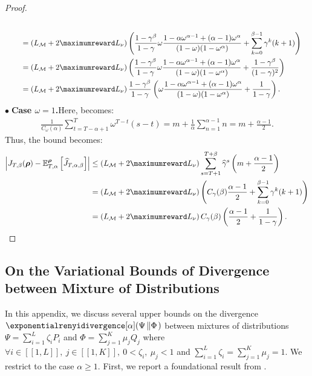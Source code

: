 \begin{proof}
\begin{align*}
    \\
    &\qquad= \left(L_{\mathcal{M}} + 2\maximumreward L_\nu\right)  \left(\frac{1-\gamma^\beta}{1-\gamma}  \omega 
    \frac{1-\alpha\omega^{\alpha-1} + (\alpha-1) \omega^\alpha}{(1-\omega)(1-\omega^\alpha)} + \sum_{k=0}^{\beta-1} \gamma^k (k+1)\right)
    \\
    &\qquad= \left(L_{\mathcal{M}} + 2\maximumreward L_\nu\right)  \left(\frac{1-\gamma^\beta}{1-\gamma}  \omega 
    \frac{1-\alpha\omega^{\alpha-1} + (\alpha-1) \omega^\alpha}{(1-\omega)(1-\omega^\alpha)} + \frac{1-\gamma^\beta}{(1-\gamma)^2}\right)
    \\
    &\qquad= \left(L_{\mathcal{M}} + 2\maximumreward L_\nu\right) \frac{1-\gamma^\beta}{1-\gamma} \left(\omega 
    \frac{1-\alpha\omega^{\alpha-1} + (\alpha-1) \omega^\alpha}{(1-\omega)(1-\omega^\alpha)} + \frac{1}{1-\gamma}\right).
\end{align*}
\noindent$\bullet\;$\textbf{Case $\omega=1$.}\indent Here,  becomes:
\begin{align*}
    \frac{1}{C_\omega(\alpha)}\sum_{t=T-\alpha+1}^{T} \omega^{T-t} (s-t)
     = m + \frac{1}{\alpha}
    \sum_{n=1}^{\alpha-1} n = m + \frac{\alpha-1}{2}.
\end{align*}
Thus, the bound becomes:
\begin{align*}
    \left|J_{T,\beta}(\boldsymbol\rho) - \mathbb{E}^{\boldsymbol\rho}_{T,\alpha}\left[\widehat{J}_{T,\alpha,\beta}\right] \right| 
    &\leq \left(L_{\mathcal{M}} + 2\maximumreward L_\nu\right) \sum_{s=T+1}^{T+\beta} \widehat{\gamma}^s \left(m +  \frac{\alpha-1}{2}\right)
    \\
    &= \left(L_{\mathcal{M}} + 2\maximumreward L_\nu\right) \left(C_{\gamma}(\beta)  \frac{\alpha-1}{2} + \sum_{k=0}^{\beta-1}\gamma^k (k+1)  \right) 
    \\
    &= \left(L_{\mathcal{M}} + 2\maximumreward L_\nu\right) C_{\gamma}(\beta) \left(\frac{\alpha-1}{2} + \frac{1}{1-\gamma}  \right). 
\end{align*}
\end{proof}




\subsection{On the Variational Bounds of \Renyi Divergence between Mixture of Distributions}
\label{app:var_bound}
In this appendix, we discuss several upper bounds on the \Renyi divergence $\exponentialrenyidivergence[\alpha](\Psi\left\Vert\Phi\right.)$ between mixtures of distributions $\textstyle\Psi = \sum_{i=1}^L \zeta_i P_i$ and $\textstyle\Phi = \sum_{j=1}^K \mu_j Q_j$ where $\forall i \in [\![1,L]\!],\ j \in [\![1,K]\!],\  0<\zeta_i,\ \mu_j <1$ and $\textstyle\sum_{i=1}^L \zeta_i = \sum_{j=1}^K \mu_j= 1$.
We restrict to the case $\alpha\ge1$. 
First, we report a foundational result from \cite{papini2019optimistic}.

